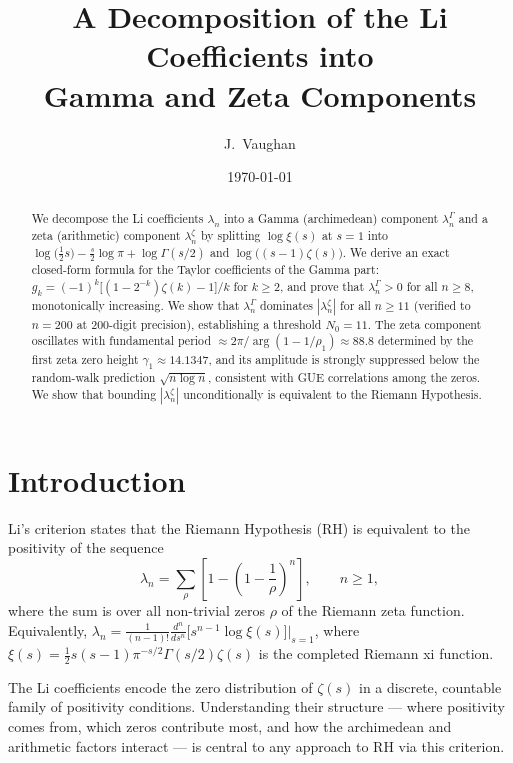 \documentclass[11pt,a4paper]{article}
\title{A Decomposition of the Li Coefficients into\\Gamma and Zeta Components}
\author{J.\ Vaughan}
\date{\today}
\newcommand{\Li}{\lambda}
\newcommand{\LiG}{\lambda^{\Gamma}}
\newcommand{\LiZ}{\lambda^{\zeta}}
\begin{document}
\maketitle

\begin{abstract}
We decompose the Li coefficients $\Li_n$ into a Gamma (archimedean) component
$\LiG_n$ and a zeta (arithmetic) component $\LiZ_n$ by splitting
$\log\xi(s)$ at $s=1$ into $\log\bigl(\tfrac{1}{2}s\bigr) - \tfrac{s}{2}\log\pi + \log\Gamma(s/2)$
and $\log\bigl((s{-}1)\zeta(s)\bigr)$. We derive an exact closed-form formula for the
Taylor coefficients of the Gamma part:
$g_k = (-1)^k\bigl[(1-2^{-k})\zeta(k)-1\bigr]/k$ for $k\ge 2$,
and prove that $\LiG_n > 0$ for all $n\ge 8$, monotonically increasing.
We show that $\LiG_n$ dominates $|\LiZ_n|$ for all $n\ge 11$
(verified to $n=200$ at 200-digit precision), establishing a threshold $N_0=11$.
The zeta component oscillates with fundamental period $\approx 2\pi/\arg(1-1/\rho_1)\approx 88.8$
determined by the first zeta zero height $\gamma_1\approx 14.1347$, and its amplitude
is strongly suppressed below the random-walk prediction $\sqrt{n\log n}$,
consistent with GUE correlations among the zeros.
We show that bounding $|\LiZ_n|$ unconditionally is equivalent to the Riemann Hypothesis.
\end{abstract}

\section{Introduction}

Li's criterion \cite{Li1997} states that the Riemann Hypothesis (RH) is equivalent
to the positivity of the sequence
\begin{equation}\label{eq:li-def}
  \Li_n = \sum_\rho \left[1 - \left(1 - \frac{1}{\rho}\right)^n\right], \qquad n \ge 1,
\end{equation}
where the sum is over all non-trivial zeros $\rho$ of the Riemann zeta function.
Equivalently, $\Li_n = \frac{1}{(n{-}1)!}\frac{d^n}{ds^n}\bigl[s^{n-1}\log\xi(s)\bigr]\big|_{s=1}$,
where $\xi(s) = \frac{1}{2}s(s{-}1)\pi^{-s/2}\Gamma(s/2)\zeta(s)$ is the completed
Riemann xi function.

The Li coefficients encode the zero distribution of $\zeta(s)$ in a discrete,
countable family of positivity conditions. Understanding their structure ---
where positivity comes from, which zeros contribute most, and how the
archimedean and arithmetic factors interact --- is central to any approach
to RH via this criterion.
\end{document}

